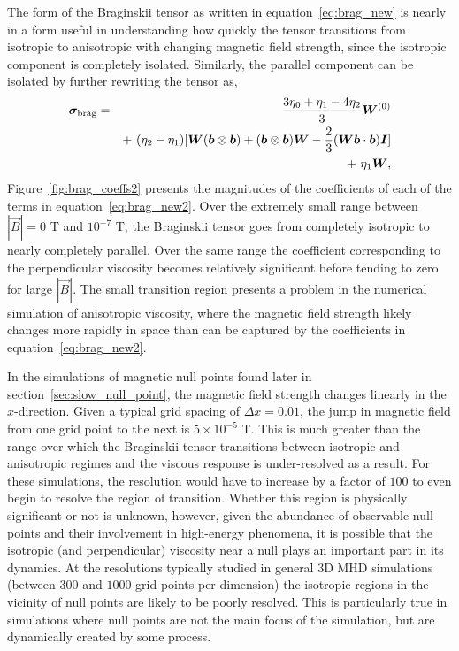 The form of the Braginskii tensor as written in equation~\ref{eq:brag_new} is nearly in a form useful in understanding how quickly the tensor transitions from isotropic to anisotropic with changing magnetic field strength, since the isotropic component is completely isolated. Similarly, the parallel component can be isolated by further rewriting the tensor as,
\begin{eqnarray}\label{eq:brag_new2}
\ten{\sigma}_{\rm brag} = &&\frac{3\eta_0+\eta_1-4\eta_2}{3}\ten{W}^{(0)}\\%
\nonumber
& &+~ (\eta_2-\eta_1)[\ten{W}(\vec{b}\otimes\vec{b})+(\vec{b}\otimes\vec{b})\ten{W} - \frac{2}{3}(\ten{W}\vec{b}\cdot\vec{b})\ten{I}] \\%
\nonumber
& &+~ \eta_1\ten{W},%
\end{eqnarray}
Figure~\ref{fig:brag_coeffs2} presents the magnitudes of the coefficients of each of the terms in equation~\ref{eq:brag_new2}. Over the extremely small range between $|\vec{B}| = 0$ T and $10^{-7}$ T, the Braginskii tensor goes from completely isotropic to nearly completely parallel. Over the same range the coefficient corresponding to the perpendicular viscosity becomes relatively significant before tending to zero for large $|\vec{B}|$. The small transition region presents a problem in the numerical simulation of anisotropic viscosity, where the magnetic field strength likely changes more rapidly in space than can be captured by the coefficients in equation~\ref{eq:brag_new2}.

In the simulations of magnetic null points found later in section~\ref{sec:slow_null_point}, the magnetic field strength changes linearly in the $x$-direction. Given a typical grid spacing of $\Delta x = 0.01$, the jump in magnetic field from one grid point to the next is $5\times 10^{-5}$ T. This is much greater than the range over which the Braginskii tensor transitions between isotropic and anisotropic regimes and the viscous response is under-resolved as a result. For these simulations, the resolution would have to increase by a factor of $100$ to even begin to resolve the region of transition. Whether this region is physically significant or not is unknown, however, given the abundance of observable null points and their involvement in high-energy phenomena, it is possible that the isotropic (and perpendicular) viscosity near a null plays an important part in its dynamics. At the resolutions typically studied in general 3D MHD simulations (between $300$ and $1000$ grid points per dimension) the isotropic regions in the vicinity of null points are likely to be poorly resolved. This is particularly true in simulations where null points are not the main focus of the simulation, but are dynamically created by some process.

